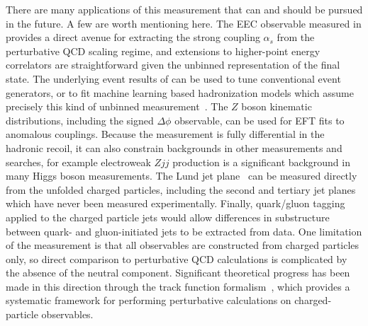There are many applications of this measurement that can and should be pursued in the future.
A few are worth mentioning here.
The EEC observable measured in  provides a direct avenue for extracting the strong coupling $\alpha_s$ from the perturbative QCD scaling regime, and extensions to higher-point energy correlators are straightforward given the unbinned representation of the final state.
The underlying event results of  can be used to tune conventional event generators, or to fit machine learning based hadronization models which assume precisely this kind of unbinned measurement~\cite{Assi:2025gog,Bierlich:2023fmh,Bierlich:2023zzd,Bierlich:2024xzg,Chan:2023ume,Ghosh:2022zdz,Ilten:2022jfm}.
The $Z$ boson kinematic distributions, including the signed $\Delta\phi$ observable, can be used for EFT fits to anomalous couplings.
Because the measurement is fully differential in the hadronic recoil, it can also constrain backgrounds in other measurements and searches, for example electroweak $Zjj$ production is a significant background in many Higgs boson measurements.
The Lund jet plane~\cite{Dreyer:2020brq} can be measured directly from the unfolded charged particles, including the second and tertiary jet planes which have never been measured experimentally.
Finally, quark/gluon tagging applied to the charged particle jets would allow differences in substructure between quark- and gluon-initiated jets to be extracted from data.
One limitation of the measurement is that all observables are constructed from charged particles only, so direct comparison to perturbative QCD calculations is complicated by the absence of the neutral component.
Significant theoretical progress has been made in this direction through the track function formalism~\cite{Chang:2013rca,Chang:2013iba}, which provides a systematic framework for performing perturbative calculations on charged-particle observables.

